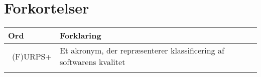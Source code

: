 \chapter{Forkortelser}

\begin{longtabu} to 
    Ord &    Forklaring\\
    \toprule\
    (F)URPS+ &	Et akronym, der repræsenterer klassificering af softwarens kvalitet \\
   
\label{forkort}
\end{longtabu}
